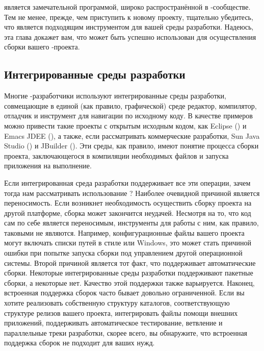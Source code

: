  является замечательной программой, широко
распространённой в \Java{}\hyp{}сообществе. Тем не менее, прежде, чем
приступить к новому проекту, тщательно убедитесь, что 
является подходящим инструментом для вашей среды разработки. Надеюсь,
эта глава докажет вам, что \GNUmake{} может быть успешно использован
для осуществления сборки вашего \Java{}\hyp{}проекта.

\subsection{Интегрированные среды разработки}

Многие \Java{}\hyp{}разработчики используют интегрированные среды
разработки, совмещающие в единой (как правило, графической) среде
редактор, компилятор, отладчик и инструмент для навигации по исходному
коду. В качестве примеров можно привести такие проекты с открытым
исходным кодом, как Eclipse ()
и Emacs JDEE (), а также, если
рассматривать коммерческие разработки, Sun Java Studio
() и JBuilder
(). Эти среды, как
правило, имеют понятие процесса сборки проекта, заключающегося в
компиляции необходимых файлов и запуска приложения на выполнение.

Если интегрированная среда разработки поддерживает все эти операции,
зачем тогда нам рассматривать использование \GNUmake{}? Наиболее
очевидной причиной является переносимость. Если возникнет
необходимость осуществить сборку проекта на другой платформе, сборка
может закончится неудачей. Несмотря на то, что код \Java{} сам по себе
является переносимым, инструменты для работы с ним, как правило,
таковыми не являются. Например, конфигурационные файлы вашего проекта
могут включать списки путей в стиле \UNIX{} или Windows, это может
стать причиной ошибки при попытке запуска сборки под управлением
другой операционной системы. Второй причиной является тот факт, что
\GNUmake{} поддерживает автоматические сборки. Некоторые
интегрированные среды разработки поддерживают пакетные сборки, а
некоторые нет. Качество этой поддержки также варьируется. Наконец,
встроенная поддержка сборок часто бывает довольно ограниченной. Если
вы хотите реализовать собственную структуру каталогов, соответствующую
структуре релизов вашего проекта, интегрировать файлы помощи внешних
приложений, поддерживать автоматическое тестирование, ветвление и
параллельные треки разработки, скорее всего, вы обнаружите, что
встроенная поддержка сборок не подходит для ваших нужд.

